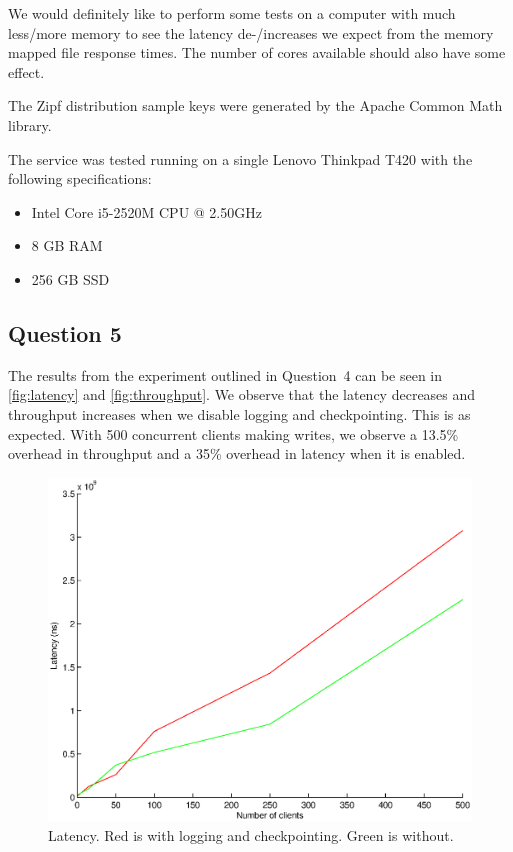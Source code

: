 \documentclass[a4paper]{article}
\begin{document}
We would definitely like to perform some tests on a computer with much
less/more memory to see the latency de-/increases we expect from the memory
mapped file response times. The number of cores available should also have some
effect.

The Zipf distribution sample keys were generated by the Apache Common Math
library.

The service was tested running on a single Lenovo Thinkpad T420 with the
following specifications:

\begin{itemize}
    \item Intel Core i5-2520M CPU @ 2.50GHz
    \item 8 GB RAM
    \item 256 GB SSD
\end{itemize}

\subsection{Question 5}

The results from the experiment outlined in Question~4 can be seen in
\autoref{fig:latency} and \autoref{fig:throughput}. We observe that the latency
decreases and throughput increases when we disable logging and checkpointing.
This is as expected. With 500 concurrent clients making writes, we observe a
13.5\% overhead in throughput and a 35\% overhead in latency when it is
enabled.

\begin{figure}[h]
    \centering
    \includegraphics[scale=0.7]{latency}
    \caption{Latency. Red is with logging and checkpointing. Green is without.}
    \label{fig:latency}
\end{figure}
\end{document}
